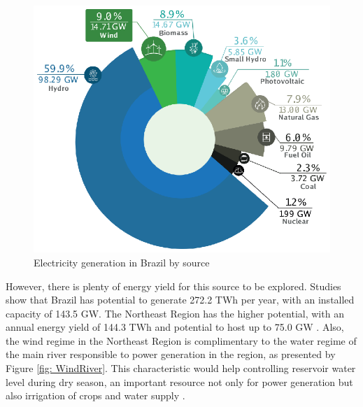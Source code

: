 \begin{figure}[b]
	\caption{Electricity generation in Brazil by source}
	\begin{center}
		\includegraphics[scale=0.75]{Images/BRshare19.eps}
	\end{center}
	\label{fig: BRshare}
\end{figure}

However, there is plenty of energy yield for this source to be explored. Studies show that Brazil has potential to generate 272.2 TWh per year, with an installed capacity of 143.5 GW. The Northeast Region has the higher potential, with an annual energy yield of 144.3 TWh and potential to host up to 75.0 GW \cite{Atlas2001}. Also, the wind regime in the Northeast Region is complimentary to the water regime of the main river responsible to power generation in the region, as presented by Figure \ref{fig: WindRiver}. This characteristic would help controlling reservoir water level during dry season, an important resource not only for power generation but also irrigation of crops and water supply \cite{ANEEL2005}.

